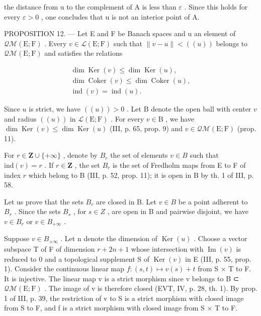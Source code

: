 the distance from u to the complement of A is less than \(\varepsilon\) . Since this holds for every \(\varepsilon > 0\) , one concludes that u is not an interior point of A.

PROPOSITION 12. --- Let E and F be Banach spaces and u an element of \(\mathcal{Q}\mathcal{M}(\mathrm{E};\mathrm{F})\) . Every \(v \in \mathcal{L}(\mathrm{E};\mathrm{F})\) such that \(\|v - u\| < ((u))\) belongs to \(\mathcal{Q}\mathcal{M}(\mathrm{E};\mathrm{F})\) and satisfies the relations

\[
\begin{array}{c} \dim \operatorname{Ker} (v) \leqslant \dim \operatorname{Ker} (u), \\ \dim \operatorname{Coker} (v) \leqslant \dim \operatorname{Coker} (u), \\ \operatorname{ind} (v) = \operatorname{ind} (u). \end{array}
\]

Since \(u\) is strict, we have \(((u)) > 0\) . Let B denote the open ball with center \(v\) and radius \(((u))\) in \(\mathcal{L}(\mathrm{E};\mathrm{F})\) . For every \(v \in \mathrm{B}\) , we have \(\dim \operatorname{Ker}(v) \leqslant \dim \operatorname{Ker}(u)\) (III, p. 65, prop. 9) and \(v \in \mathcal{Q}\mathcal{M}(\mathrm{E};\mathrm{F})\) (prop. 11).

For \(r \in \mathbf{Z} \cup \{+\infty\}\) , denote by \(B_r\) the set of elements \(v \in B\) such that \(\text{ind}(v) = r\) . If \(r \in \mathbf{Z}\) , the set \(B_r\) is the set of Fredholm maps from E to F of index \(r\) which belong to B (III, p. 52, prop. 11); it is open in B by th. 1 of III, p. 58.

Let us prove that the sets \(B_{r}\) are closed in B. Let \(v \in B\) be a point adherent to \(B_{r}\) . Since the sets \(B_{s}\) , for \(s \in Z\) , are open in B and pairwise disjoint, we have \(v \in B_{r}\) or \(v \in B_{+\infty}\) .

Suppose \(v \in B_{+\infty}\) . Let n denote the dimension of \(\operatorname{Ker}(u)\) . Choose a vector subspace T of F of dimension \(r + 2n + 1\) whose intersection with \(\operatorname{Im}(v)\) is reduced to 0 and a topological supplement S of \(\operatorname{Ker}(v)\) in E (III, p. 55, prop. 1). Consider the continuous linear map \(f: (s, t) \mapsto v(s) + t\) from S × T to F. It is injective. The linear map v is a strict morphism since v belongs to B ⊂ \(\mathcal{Q}\mathcal{M}(\mathrm{E};\mathrm{F})\) . The image of v is therefore closed (EVT, IV, p. 28, th. 1). By prop. 1 of III, p. 39, the restriction of v to S is a strict morphism with closed image from S to F, and f is a strict morphism with closed image from S × T to F.

